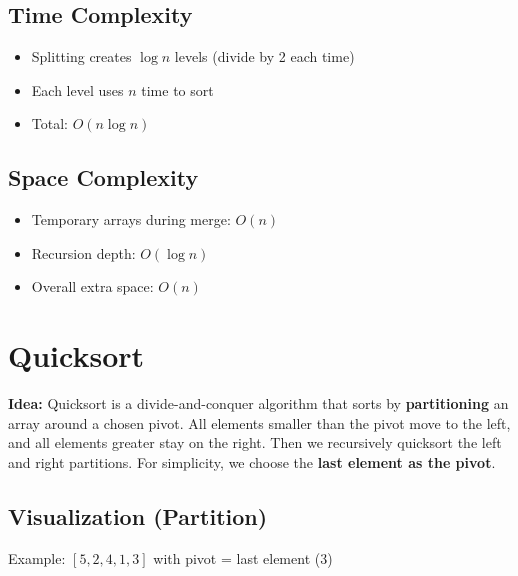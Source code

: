 \documentclass{article}
\begin{document}
\subsection{Time Complexity}
\begin{itemize}
  \item Splitting creates $\log n$ levels (divide by 2 each time)
  \item Each level uses $n$ time to sort
  \item Total: \textbf{$O(n\log n)$}
\end{itemize}

\subsection{Space Complexity}
\begin{itemize}
  \item Temporary arrays during merge: $O(n)$
  \item Recursion depth: $O(\log n)$
  \item Overall extra space: \textbf{$O(n)$}
\end{itemize}

\section{Quicksort}

\textbf{Idea:} Quicksort is a divide-and-conquer algorithm that sorts by
\textbf{partitioning} an array around a chosen pivot.
All elements smaller than the pivot move to the left,
and all elements greater stay on the right.
Then we recursively quicksort the left and right partitions. For simplicity, we choose the \textbf{last element as the pivot}.

\subsection{Visualization (Partition)}
Example: \([5,2,4,1,3]\) with pivot = last element (3)
\end{document}
